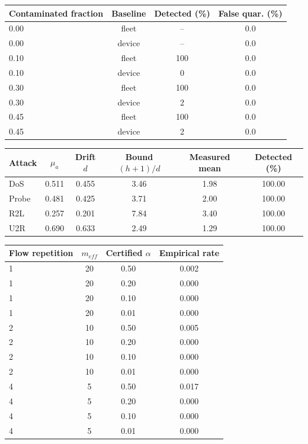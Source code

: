 \begin{tabular}{lccc}
\toprule
Contaminated fraction & Baseline & Detected (\%) & False quar. (\%) \\
\midrule
0.00 & fleet & -- & 0.0 \\
0.00 & device & -- & 0.0 \\
0.10 & fleet & 100 & 0.0 \\
0.10 & device & 0 & 0.0 \\
0.30 & fleet & 100 & 0.0 \\
0.30 & device & 2 & 0.0 \\
0.45 & fleet & 100 & 0.0 \\
0.45 & device & 2 & 0.0 \\
\bottomrule
\end{tabular}

\begin{tabular}{lccccc}
\toprule
Attack & $\mu_a$ & Drift $d$ & Bound $(h+1)/d$ & Measured mean & Detected (\%) \\
\midrule
DoS & 0.511 & 0.455 & 3.46 & 1.98 & 100.00 \\
Probe & 0.481 & 0.425 & 3.71 & 2.00 & 100.00 \\
R2L & 0.257 & 0.201 & 7.84 & 3.40 & 100.00 \\
U2R & 0.690 & 0.633 & 2.49 & 1.29 & 100.00 \\
\bottomrule
\end{tabular}

\begin{tabular}{lccc}
\toprule
Flow repetition & $m_{eff}$ & Certified $\alpha$ & Empirical rate \\
\midrule
1 & 20 & 0.50 & 0.002 \\
1 & 20 & 0.20 & 0.000 \\
1 & 20 & 0.10 & 0.000 \\
1 & 20 & 0.01 & 0.000 \\
2 & 10 & 0.50 & 0.005 \\
2 & 10 & 0.20 & 0.000 \\
2 & 10 & 0.10 & 0.000 \\
2 & 10 & 0.01 & 0.000 \\
4 & 5 & 0.50 & 0.017 \\
4 & 5 & 0.20 & 0.000 \\
4 & 5 & 0.10 & 0.000 \\
4 & 5 & 0.01 & 0.000 \\
\bottomrule
\end{tabular}

